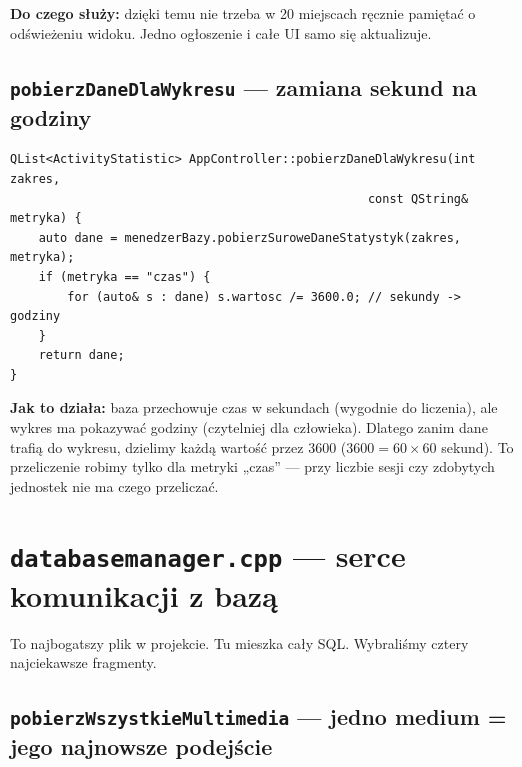 \documentclass[11pt,a4paper]{article}
\begin{document}
\textbf{Do czego służy:} dzięki temu nie trzeba w 20 miejscach ręcznie pamiętać
o odświeżeniu widoku. Jedno ogłoszenie i całe UI samo się aktualizuje.

\subsection{\texttt{pobierzDaneDlaWykresu} --- zamiana sekund na godziny}

\begin{lstlisting}[caption={Jedyne miejsce z prawdziwą logiką liczenia}]
QList<ActivityStatistic> AppController::pobierzDaneDlaWykresu(int zakres,
                                                  const QString& metryka) {
    auto dane = menedzerBazy.pobierzSuroweDaneStatystyk(zakres, metryka);
    if (metryka == "czas") {
        for (auto& s : dane) s.wartosc /= 3600.0; // sekundy -> godziny
    }
    return dane;
}
\end{lstlisting}

\textbf{Jak to działa:} baza przechowuje czas w sekundach (wygodnie do liczenia),
ale wykres ma pokazywać godziny (czytelniej dla człowieka). Dlatego zanim dane
trafią do wykresu, dzielimy każdą wartość przez 3600 ($3600 = 60 \times 60$ sekund).
To przeliczenie robimy tylko dla metryki „czas” --- przy liczbie sesji czy
zdobytych jednostek nie ma czego przeliczać.

\section{\texttt{databasemanager.cpp} --- serce komunikacji z bazą}

To najbogatszy plik w projekcie. Tu mieszka cały SQL. Wybraliśmy cztery
najciekawsze fragmenty.

\subsection{\texttt{pobierzWszystkieMultimedia} --- jedno medium = jego najnowsze podejście}
\end{document}

